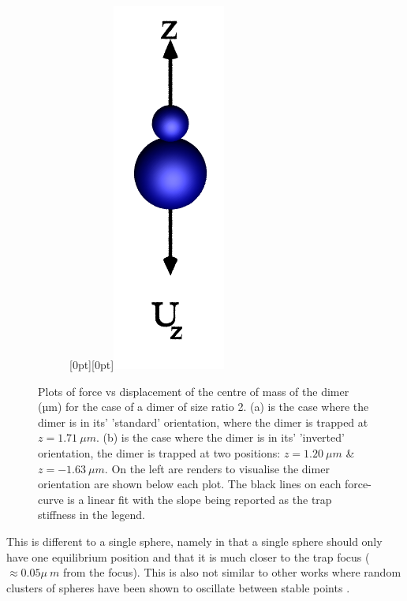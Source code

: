 \begin{figure}[h!]
\begin{subfigure}{.65\linewidth}
		\caption{}
		\label{lam=2_inverted}
	\end{subfigure}\hfill %
	\begin{subfigure}{.25\linewidth}
		\centering
		\raisebox{40pt}[0pt][0pt]{\makebox{}\includegraphics[width=0.3\linewidth, keepaspectratio]{theta=180.png}}
		\label{small_over_large}
	\end{subfigure}
	\caption{Plots of force vs displacement of the centre of mass of the 
		dimer (µm) for the case of a dimer of size ratio 2. (a) is the 
		case where the dimer is in its' 'standard' orientation, where 
		the dimer is trapped at $z = 1.71\ \mu m$. (b) is the case where 
		the dimer is in its' 'inverted' orientation, the dimer is trapped 
		at two positions: $z = 1.20\ \mu m$ \& $z=-1.63\ \mu m$. On the 
		left are renders to visualise the dimer orientation are shown 
		below each plot. The black lines on each force-curve is a linear 
		fit with the slope being reported as the trap stiffness in the 
		legend.}
	\label{fig:paradigmatic}
\end{figure}

This is different to a single sphere, namely in that a
single sphere should only have one equilibrium position
and that it is much closer to the trap focus ($\approx
0.05\mu\ m$ from the focus). This is also not similar 
to other works where random clusters of spheres have 
been shown to oscillate between stable points 
\cite{Vigilante2020}.

